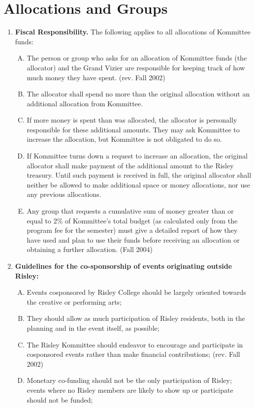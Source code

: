 \documentclass[12pt]{article}
\begin{document}
\section*{Allocations and Groups}
\begin{enumerate}[1.]
\item \textbf{Fiscal Responsibility.} The following applies to all allocations of Kommittee funds: 
\begin{enumerate}[A.]
\item The person or group who asks for an allocation of Kommittee funds (the allocator) and the Grand Vizier are responsible for keeping track of how much money they have spent. (rev. Fall 2002) 
\item The allocator shall spend no more than the original allocation without an additional allocation from Kommittee. 
\item If more money is spent than was allocated, the allocator is personally responsible for these additional amounts. They may ask Kommittee to increase the allocation, but Kommittee is not obligated to do so. 
\item If Kommittee turns down a request to increase an allocation, the original allocator shall make payment of the additional amount to the Risley treasury. Until such payment is received in full, the original allocator shall neither be allowed to make additional space or money allocations, nor use any previous allocations. 
\item Any group that requests a cumulative sum of money greater than or equal to 2\% of Kommittee's total budget (as calculated only from the program fee for the semester) must give a detailed report of how they have used and plan to use their funds before receiving an allocation or obtaining a further allocation. (Fall 2004)
\end{enumerate}
\item \textbf{Guidelines for the co-sponsorship of events originating outside Risley:}
\begin{enumerate}[A.]
\item Events cosponsored by Risley College should be largely oriented towards the creative or performing arts; 
\item They should allow as much participation of Risley residents, both in the planning and in the event itself, as possible; 
\item The Risley Kommittee should endeavor to encourage and participate in cosponsored events rather than make financial contributions; (rev. Fall 2002) 
\item Monetary co-funding should not be the only participation of Risley; events where no Risley members are likely to show up or participate should not be funded; 

\end{enumerate}
\end{enumerate}
\end{document}
